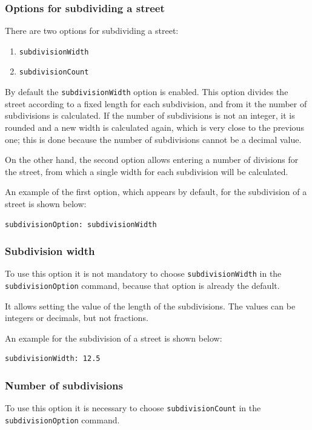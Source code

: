 \documentclass[12pt,a4paper]{book}
\begin{document}
\subsubsection*{Options for subdividing a street}
There are two options for subdividing a street:
\begin{enumerate}
  \item \texttt{subdivisionWidth}
  \item \texttt{subdivisionCount}
\end{enumerate}
By default the \texttt{subdivisionWidth} option is enabled. This option divides the street
according to a fixed length for each subdivision, and from it the number of subdivisions is
calculated. If the number of subdivisions is not an integer, it is rounded and a new width is
calculated again, which is very close to the previous one; this is done because the number of
subdivisions cannot be a decimal value.

On the other hand, the second option allows entering a number of divisions for the street, from
which a single width for each subdivision will be calculated.

An example of the first option, which appears by default, for the subdivision of a street is shown
below:
\begin{lstlisting}[style=control]
subdivisionOption: subdivisionWidth
\end{lstlisting}

\subsubsection*{Subdivision width}
To use this option it is not mandatory to choose \texttt{subdivisionWidth} in the
\texttt{subdivisionOption} command, because that option is already the default.

It allows setting the value of the length of the subdivisions. The values can be integers or
decimals, but not fractions.

An example for the subdivision of a street is shown below:
\begin{lstlisting}[style=control]
subdivisionWidth: 12.5
\end{lstlisting}

\subsubsection*{Number of subdivisions}
{\sloppy To use this option it is necessary to choose \texttt{subdivisionCount} in the
\texttt{subdivisionOption} command.\par}
\end{document}
